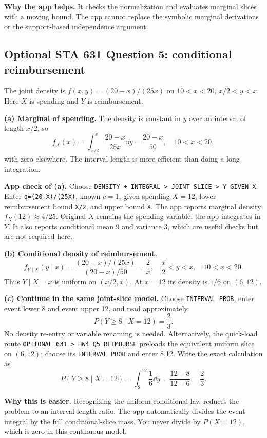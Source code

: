 \textbf{Why the app helps.} It checks the normalization and evaluates marginal slices with a moving bound. The app cannot replace the symbolic marginal derivations or the support-based independence argument.

\clearpage
\subsection{Optional STA 631 Question 5: conditional reimbursement}
The joint density is $f(x,y)=(20-x)/(25x)$ on $10<x<20$, $x/2<y<x$. Here $X$ is spending and $Y$ is reimbursement.

\textbf{(a) Marginal of spending.} The density is constant in $y$ over an interval of length $x/2$, so
\[
\boxed{f_X(x)=\int_{x/2}^x\frac{20-x}{25x}\dd y
=\frac{20-x}{50},\quad10<x<20,}
\]
with zero elsewhere. The interval length is more efficient than doing a long integration.

\textbf{App check of (a).} Choose \texttt{DENSITY + INTEGRAL > JOINT SLICE > Y GIVEN X}. Enter \texttt{q=(20-X)/(25X)}, known $c=1$, given spending $X=12$, lower reimbursement bound \texttt{X/2}, and upper bound \texttt{X}. The app reports marginal density $f_X(12)\approx4/25$. Original $X$ remains the spending variable; the app integrates in $Y$. It also reports conditional mean 9 and variance 3, which are useful checks but are not required here.

\textbf{(b) Conditional density of reimbursement.}
\[
\boxed{f_{Y\mid X}(y\mid x)=\frac{(20-x)/(25x)}{(20-x)/50}
=\frac2x,\quad\frac x2<y<x,\quad10<x<20.}
\]
Thus $Y\mid X=x$ is uniform on $(x/2,x)$. At $x=12$ its density is $1/6$ on $(6,12)$.

\textbf{(c) Continue in the same joint-slice model.} Choose \texttt{INTERVAL PROB}, enter event lower 8 and event upper 12, and read approximately
\[
\boxed{P(Y\ge8\mid X=12)=\frac23.}
\]
No density re-entry or variable renaming is needed. Alternatively, the quick-load route \texttt{OPTIONAL 631 > HW4 Q5 REIMBURSE} preloads the equivalent uniform slice on $(6,12)$; choose its \texttt{INTERVAL PROB} and enter 8,12.
Write the exact calculation as
\[
P(Y\ge8\mid X=12)=\int_8^{12}\frac16\dd y
=\frac{12-8}{12-6}=\frac23.
\]

\textbf{Why this is easier.} Recognizing the uniform conditional law reduces the problem to an interval-length ratio. The app automatically divides the event integral by the full conditional-slice mass. You never divide by $P(X=12)$, which is zero in this continuous model.
